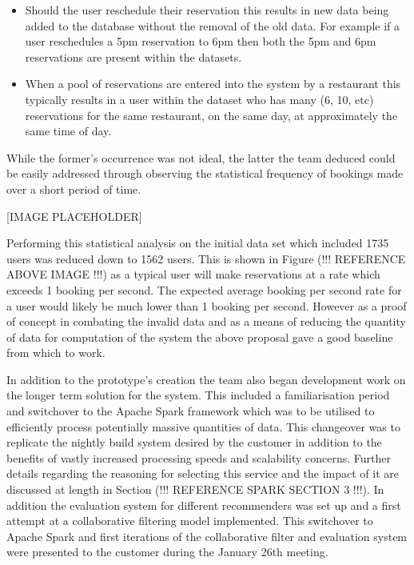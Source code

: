 \documentclass{l3proj}
\begin{document}
\begin{itemize}
\item Should the user reschedule their reservation this results in new data being added to the database without the removal of the old data. For example if a user reschedules a 5pm reservation to 6pm then both the 5pm and 6pm reservations are present within the datasets.
\item When a pool of reservations are entered into the system by a restaurant this typically results in a user within the dataset who has many (6, 10, etc) reservations for the same restaurant, on the same day, at approximately the same time of day.
\end{itemize}

While the former’s occurrence was not ideal, the latter the team deduced could be easily addressed through observing the statistical frequency of bookings made over a short period of time.

[IMAGE PLACEHOLDER]

Performing this statistical analysis on the initial data set which included 1735 users was reduced down to 1562 users. This is shown in Figure (!!! REFERENCE ABOVE IMAGE !!!) as a typical user will make reservations at a rate which exceeds 1 booking per second. The expected average booking per second rate for a user would likely be much lower than 1 booking per second. However as a proof of concept in combating the invalid data and as a means of reducing the quantity of data for computation of the system the above proposal gave a good baseline from which to work.

In addition to the prototype’s creation the team also began development work on the longer term solution for the system. This included a familiarisation period and switchover to the Apache Spark framework which was to be utilised to efficiently process potentially massive quantities of data. This changeover was to replicate the nightly build system desired by the customer in addition to the benefits of vastly increased processing speeds and scalability concerns. Further details regarding the reasoning for selecting this service and the impact of it are discussed at length in Section (!!! REFERENCE SPARK SECTION 3 !!!). In addition the evaluation system for different recommenders was set up and a first attempt at a collaborative filtering model implemented. This switchover to Apache Spark and first iterations of the collaborative filter and evaluation system were presented to the customer during the January 26th meeting.
\end{document}
